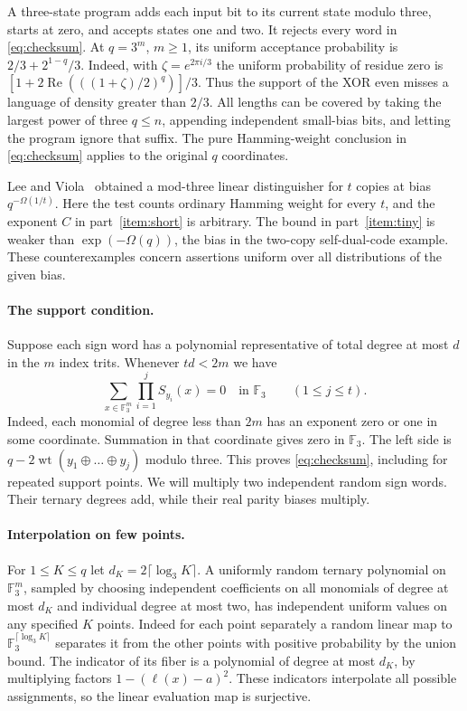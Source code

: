 \documentclass[11pt]{article}
\newcommand{\F}{\mathbb F_3}
\newcommand{\wt}{\operatorname{wt}}
\begin{document}
A three-state program adds each input bit to its current state modulo
three, starts at zero, and accepts states one and two. It rejects every
word in \eqref{eq:checksum}. At $q=3^m$, $m\ge1$, its uniform acceptance
probability is $2/3+2^{1-q}/3$. Indeed, with
$\zeta=e^{2\pi i/3}$ the uniform probability of residue zero is
$[1+2\operatorname{Re}(((1+\zeta)/2)^q)]/3$.
Thus the support of the XOR even misses a language of density greater
than $2/3$. All lengths can be covered by taking the largest power of
three $q\le n$, appending independent small-bias bits, and letting the
program ignore that suffix. The pure Hamming-weight conclusion in
\eqref{eq:checksum} applies to the original $q$ coordinates.

Lee and Viola~\cite[Theorem 1.4(iv)]{LV} obtained a mod-three linear
distinguisher for $t$ copies at bias $q^{-\Omega(1/t)}$. Here the test
counts ordinary Hamming weight for every $t$, and the exponent $C$ in
part~\ref{item:short} is arbitrary. The bound in part~\ref{item:tiny} is
weaker than $\exp(-\Omega(q))$, the bias in the two-copy self-dual-code
example. These counterexamples concern assertions uniform over
all distributions of the given bias.

\paragraph{The support condition.}
Suppose each sign word has a polynomial representative of total degree
at most $d$ in the $m$ index trits. Whenever $td<2m$ we have
\[
  \sum_{x\in\F^m}\prod_{i=1}^j S_{y_i}(x)=0\quad\text{in }\F
               \qquad (1\le j\le t).
\]
Indeed, each monomial of degree less than $2m$ has an exponent zero or
one in some coordinate. Summation in that coordinate gives zero in
$\F$. The left side is $q-2\wt(y_1\oplus\dots\oplus y_j)$ modulo
three. This proves \eqref{eq:checksum}, including for repeated support
points. We will multiply two independent random sign words. Their
ternary degrees add, while their real parity biases multiply.

\paragraph{Interpolation on few points.}
For $1\le K\le q$ let $d_K=2\lceil\log_3K\rceil$. A uniformly random
ternary polynomial on $\F^m$, sampled by choosing independent coefficients
on all monomials of degree at most $d_K$ and individual degree at most
two, has independent uniform values on any specified $K$ points.
Indeed for each point separately a random linear map to
$\F^{\lceil\log_3 K\rceil}$ separates it from the other points with
positive probability by the union bound. The indicator of its fiber is
a polynomial of degree at most $d_K$, by multiplying factors
$1-(\ell(x)-a)^2$. These indicators interpolate all possible
assignments, so the linear evaluation map is surjective.
\end{document}
